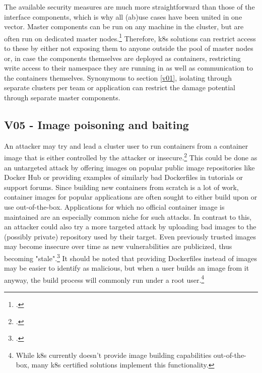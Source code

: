 The available security measures are much more straightforward than those of the interface components, which is why all (ab)use cases have been united in one vector.
Master components can be run on any machine in the cluster, but are often run on dedicated master nodes.\footcite[][, section 'Master Components']{k8sComponents}
Therefore, \gls{k8s} solutions can restrict access to these by either not exposing them to anyone outside the pool of master nodes or, in case the components themselves are deployed as containers, restricting write access to their namespace they are running in as well as communication to the containers themselves.
Synonymous to section \ref{v01}, isolating through separate clusters per team or application can restrict the damage potential through separate master components.

\subsection{V05 - Image poisoning and baiting} \label{v05}
An attacker may try and lead a cluster user to run containers from a container image that is either controlled by the attacker or insecure.\footcite[][, p. 13 to 14]{nistK8s}
This could be done as an untargeted attack by offering images on popular public image repositories like Docker Hub or providing examples of similarly bad Dockerfiles in tutorials or support forums.
Since building new containers from scratch is a lot of work, container images for popular applications are often sought to either build upon or use out-of-the-box.
Applications for which no official container image is maintained are an especially common niche for such attacks.
In contrast to this, an attacker could also try a more targeted attack by uploading bad images to the (possibly private) repository used by their target.
Even previously trusted images may become insecure over time as new vulnerabilities are publicized, thus becoming "stale".\footcite[][, p. 14]{nistK8s}
It should be noted that providing Dockerfiles instead of images may be easier to identify as malicious, but when a user builds an image from it anyway, the build process will commonly run under a root user.\footnote{While \gls{k8s} currently doesn't provide image building capabilities out-of-the-box, many \gls{k8s} certified solutions implement this functionality.}

